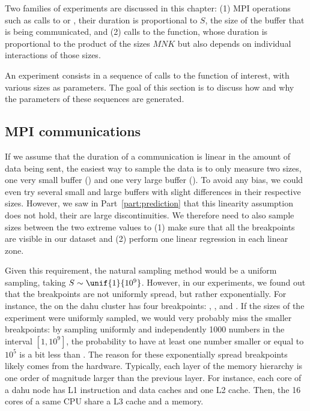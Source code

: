         Two families of experiments are discussed in this chapter: (1) MPI operations such as calls to
        \recv or \send, their duration is proportional to \(S\), the size of the buffer that is
        being communicated, and (2) calls to the \dgemm function, whose duration is proportional to the product
        of the sizes \(MNK\) but also depends on individual interactions of those sizes.

        An experiment consists in a sequence of calls to the function of interest, with various sizes as parameters. The
        goal of this section is to discuss how and why the parameters of these sequences are generated.

        \subsection{MPI communications}%

            If we assume that the duration of a communication is linear in the amount of data being sent, the easiest
            way to sample the data is to only measure two sizes, one very small buffer (\eg {}) and one very
            large buffer (\eg {}). To avoid any bias, we could even try several small and large
            buffers with slight differences in their respective sizes. However, we saw in Part~\ref{part:prediction}
            that this linearity assumption does not hold, their are large discontinuities. We therefore need to also
            sample sizes between the two extreme values to (1) make sure that all the breakpoints are visible in our
            dataset and (2) perform one linear regression in each linear zone.

            Given this requirement, the natural sampling method would be a uniform sampling, taking
            \(S\sim\unif{1}{10^9}\). However, in our experiments, we found out that the breakpoints are not uniformly
            spread, but rather exponentially. For instance, the \send on the dahu cluster has four
            breakpoints: , ,  and
            . If the sizes of the experiment were uniformly sampled, we would very probably miss
            the smaller breakpoints: by sampling uniformly and independently 1000 numbers in the interval \([1, 10^9]\),
            the probability to have at least one number smaller or equal to \(10^5\) is a bit less than
            . The reason for these exponentially spread breakpoints likely comes from the hardware.
            Typically, each layer of the memory hierarchy is one order of magnitude larger than the previous layer. For
            instance, each core of a dahu node has  L1 instruction and data caches and one
             L2 cache. Then, the 16 cores of a same CPU share a  L3 cache and
            a  memory.


